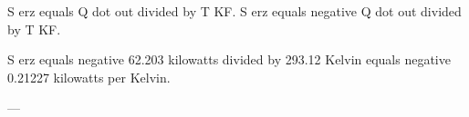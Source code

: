 S erz equals Q dot out divided by T KF.  
S erz equals negative Q dot out divided by T KF.  

S erz equals negative 62.203 kilowatts divided by 293.12 Kelvin equals negative 0.21227 kilowatts per Kelvin.  

---